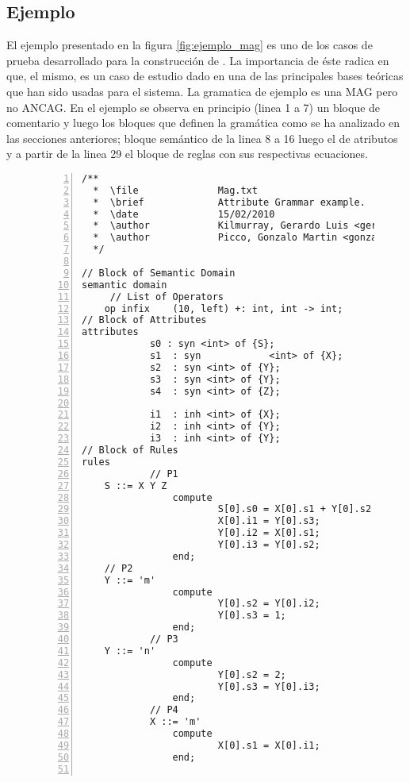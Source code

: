 {\subsection{Ejemplo}
El ejemplo presentado en la figura \ref{fig:ejemplo_mag} es uno de los casos de prueba desarrollado para la construcción de \maggen. La importancia de éste radica en que, el mismo, es un caso de estudio dado en una de las principales bases teóricas que han sido usadas para el sistema. La gramatica de ejemplo es una MAG pero no ANCAG.
En el ejemplo se observa en principio (linea 1 a 7) un bloque de comentario y luego los bloques que definen la gramática como se ha analizado en las secciones anteriores; bloque semántico de la linea 8 a 16 luego el de atributos y a partir de la linea 29 el bloque de reglas con sus respectivas ecuaciones.

\begin{figure}
  \centering
\lstset{language=inform}
\scriptsize
\begin{lstlisting}[frame=single,numbers=left]
/**
  *  \file              Mag.txt
  *  \brief             Attribute Grammar example.
  *  \date              15/02/2010
  *  \author            Kilmurray, Gerardo Luis <gerakilmurray@gmail.com>
  *  \author            Picco, Gonzalo Martin <gonzalopicco@gmail.com>
  */

// Block of Semantic Domain
semantic domain
     // List of Operators 
    op infix    (10, left) +: int, int -> int;
// Block of Attributes
attributes
            s0 : syn <int> of {S};
            s1  : syn            <int> of {X};
            s2  : syn <int> of {Y};
            s3  : syn <int> of {Y};
            s4  : syn <int> of {Z};
                
            i1  : inh <int> of {X};
            i2  : inh <int> of {Y};
            i3  : inh <int> of {Y};
// Block of Rules
rules
            // P1
    S ::= X Y Z
                compute                        
                        S[0].s0 = X[0].s1 + Y[0].s2 + Y[0].s3 + Z[0].s4;
                        X[0].i1 = Y[0].s3;
                        Y[0].i2 = X[0].s1;
                        Y[0].i3 = Y[0].s2;
                end;
    // P2
    Y ::= 'm'
                compute
                        Y[0].s2 = Y[0].i2;
                        Y[0].s3 = 1;
                end;
            // P3
    Y ::= 'n'
                compute
                        Y[0].s2 = 2;
                        Y[0].s3 = Y[0].i3;
                end;
            // P4
            X ::= 'm'
                compute
                        X[0].s1 = X[0].i1;
                end;
                        

\end{lstlisting}
\end{figure}}
